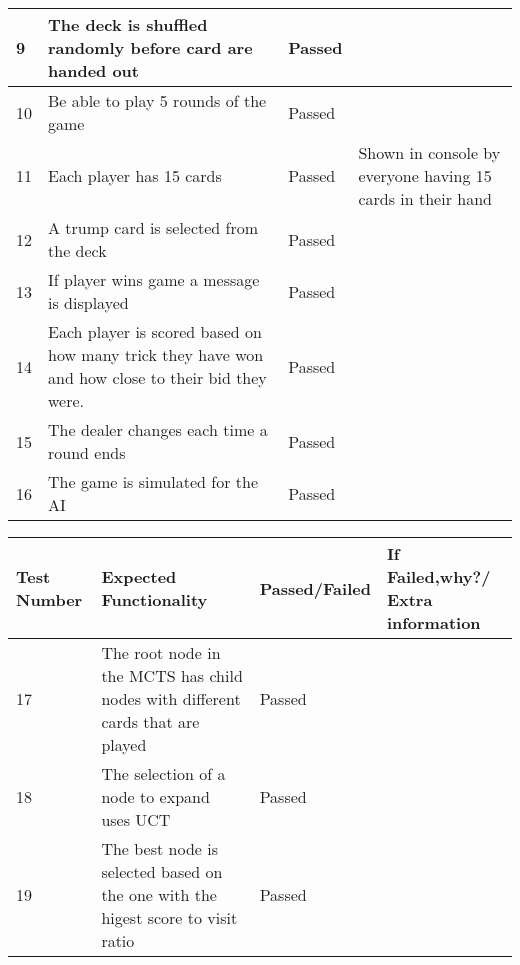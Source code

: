 \begin{center}
\begin{table}
\begin{tabular}{| l | p{5cm} | l | p{5cm} |}
        9           & The deck is shuffled randomly before card are handed out                                          & Passed        & ~                                                                                   \\ \hline
        10          & Be able to play 5 rounds of the game                                                              & Passed        & ~                                                                                   \\ \hline
        11          & Each player has 15 cards                                                                          & Passed        & Shown in console by everyone having 15 cards in their hand                          \\ \hline
        12          & A trump card is selected from the deck                                                            & Passed        & ~                                                                                   \\ \hline
        13          & If player wins game a message is displayed                                                        & Passed        & ~                                                                                   \\ \hline
        14          & Each player is scored based on how many trick they have won and how close to their bid they were. & Passed        & ~                                                                                   \\ \hline
        15          & The dealer changes each time a round ends                                                         & Passed        & ~                                                                                   \\ \hline
        16          & The game is simulated for the AI                                                                  & Passed        & ~                                                                                   \\ \hline
        \hline
    \end{tabular}
\end{table}
\end{center}
\newpage

\begin{center}
\begin{table}
\begin{tabular}{| l | p{5cm} | l | p{5cm} |}
\hline
Test Number & Expected Functionality & Passed/Failed & If Failed,why?/ Extra information \\ \hline
17 & The root node in the MCTS has child nodes with different cards that are played & Passed & ~ \\ \hline
18 & The selection of a node to expand uses UCT & Passed & ~ \\ \hline
19 & The best node is selected based on the one with the higest score to visit ratio & Passed & ~ \\
\hline
\end{tabular}
\end{table}
\end{center}
